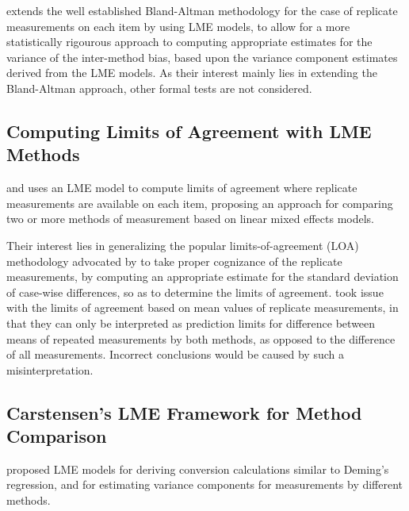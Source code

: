\documentclass[12pt, a4paper]{report}
\theoremstyle{plain}
\theoremstyle{definition}
\theoremstyle{remark}
\begin{document}
	
	\citet{BXC2008} extends the well established Bland-Altman methodology for the case of replicate measurements on each item by using LME models, to allow for a more statistically rigourous approach to computing appropriate estimates for the variance of the inter-method bias, based upon the variance component estimates derived from the LME models. As their interest mainly lies in extending the Bland-Altman approach, other formal tests are not considered.  
	
	
	
	\subsection{Computing Limits of Agreement with LME Methods}

	\citet{BXC2004} and \citet{BXC2008} uses an LME model to compute limits of agreement where replicate measurements are available on each item, proposing an approach for comparing two or more methods of measurement based on linear mixed effects models. 
	
	Their interest lies in generalizing the popular limits-of-agreement (LOA) methodology advocated by \citet{BA86} to take proper cognizance of the replicate measurements, by computing an appropriate estimate for the standard deviation of case-wise differences, so as to determine the limits of agreement.
		\citet{BXC2008} took issue with the limits of agreement based on mean values of replicate measurements, in that they can only be interpreted as prediction limits for difference between means of repeated measurements by both methods, as opposed to the difference of all measurements.
	Incorrect conclusions would be caused by such a misinterpretation.
	
	
	
	\subsection{Carstensen's LME Framework for Method Comparison}
	
\citet{BXC2004} proposed LME models for deriving conversion calculations similar to Deming's regression, and for estimating variance components for measurements by different methods.
	
\end{document}
